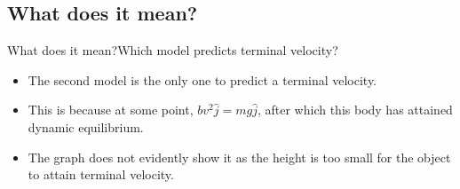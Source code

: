 





\subsection{What does it mean?}
\begin{frame}{What does it mean?}{Which model predicts terminal velocity?}
\begin{itemize}
    \item The second model is the only one to predict a terminal velocity.
    \item This is because at some point, \(bv^2\hat{j} = mg\hat{j}\), after 
    which this body has attained dynamic equilibrium.
    \item The graph does not evidently show it as the height is too small 
    for the object to attain terminal velocity.
\end{itemize}
\end{frame}